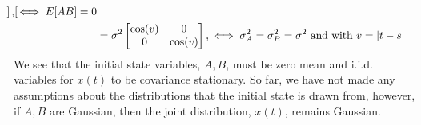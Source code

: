 \begin{defn}
\begin{align}
\begin{bmatrix}
\end{bmatrix}, \text{$\iff E[AB] =0$} \\ 
&=\sigma^2 \begin{bmatrix} 
\cos(v) & 0 \\ 
0 & \cos(v)  \\
\end{bmatrix}, \text{$ \iff \sigma_A^2 = \sigma_B^2 = \sigma^2$ and with $v= |t-s|$} \label{eqn:cov_circle}
\end{align}
We see that the initial state variables, $A,B$, must be zero mean and i.i.d. variables for $x(t)$ to be covariance stationary. So far, we have not made any assumptions about the distributions that the initial state is drawn from, however, if $A,B$ are Gaussian, then the joint distribution, $x(t)$, remains Gaussian.
\end{defn}

